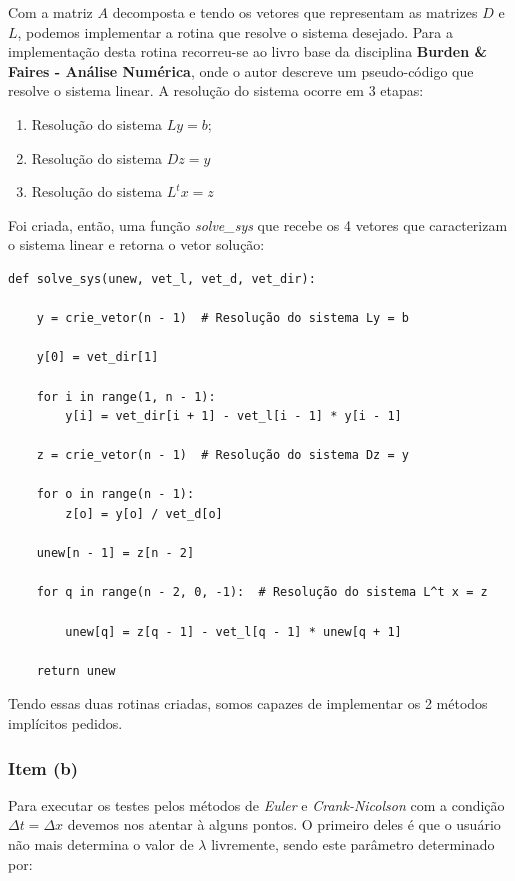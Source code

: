 \documentclass[a4paper, 12pt]{article}
\begin{document}
Com a matriz $A$ decomposta e tendo os vetores que representam as matrizes $D$ e $L$, podemos implementar a rotina que resolve o sistema desejado. Para a implementação desta rotina recorreu-se ao livro base da disciplina \textbf{Burden \& Faires - Análise Numérica}, onde o autor descreve um pseudo-código que resolve o sistema linear. A resolução do sistema ocorre em 3 etapas:

\begin{enumerate}[i]
	
	\item Resolução do sistema $Ly=b$;
	
	\item Resolução do sistema $Dz=y$
	
	\item Resolução do sistema $L^{t}x=z$

\end{enumerate}

Foi criada, então, uma função \textit{solve\_sys} que recebe os 4 vetores que caracterizam o sistema linear e retorna o vetor solução:

\begin{verbatim}
def solve_sys(unew, vet_l, vet_d, vet_dir):

    y = crie_vetor(n - 1)  # Resolução do sistema Ly = b

    y[0] = vet_dir[1]

    for i in range(1, n - 1):
        y[i] = vet_dir[i + 1] - vet_l[i - 1] * y[i - 1]

    z = crie_vetor(n - 1)  # Resolução do sistema Dz = y

    for o in range(n - 1):
        z[o] = y[o] / vet_d[o]

    unew[n - 1] = z[n - 2]

    for q in range(n - 2, 0, -1):  # Resolução do sistema L^t x = z

        unew[q] = z[q - 1] - vet_l[q - 1] * unew[q + 1]

    return unew
\end{verbatim}

Tendo essas duas rotinas criadas, somos capazes de implementar os 2 métodos implícitos pedidos.

\subsubsection{Item (b)}

Para executar os testes pelos métodos de \textit{Euler} e \textit{Crank-Nicolson} com a condição $\Delta t = \Delta x$ devemos nos atentar à alguns pontos. O primeiro deles é que o usuário não mais determina o valor de $\lambda$ livremente, sendo este parâmetro determinado por:
\end{document}
